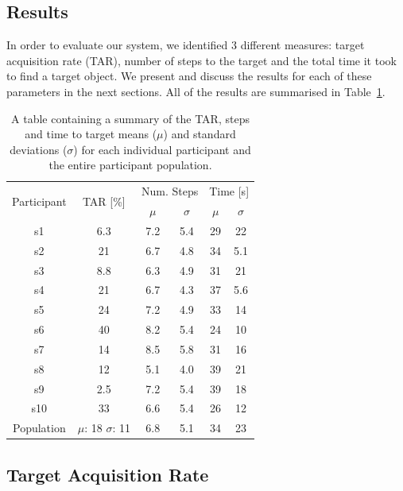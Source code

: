 \documentclass[a4paper, twoside]{article}
\begin{document}
\subsection{Results}

\noindent In order to evaluate our system, we identified 3 different measures: target acquisition rate (TAR), number of steps to the target and the total time it took to find a target object. We present and discuss the results for each of these parameters in the next sections. All of the results are summarised in Table~\ref{tab:results-summary}.

\begin{table}
  \centering
  \caption{A table containing a summary of the TAR, steps and time to target means ($\mu$) and standard deviations ($\sigma$) for each individual participant and the entire participant population.}\label{tab:results-summary}
  \begin{tabular}{cc|cc|cc}
    \toprule
    \multirow{2}{*}{Participant} & \multirow{2}{*}{TAR [\%]} & \multicolumn{2}{c|}{Num. Steps} & \multicolumn{2}{c}{Time [s]} \\ 
				 &			     & $\mu$ & $\sigma$		       & $\mu$ & $\sigma$  \\ \midrule
    s1 & 6.3 & 7.2 & 5.4 & 29 & 22 \\ \midrule
    s2 & 21 & 6.7 & 4.8 & 34 & 5.1 \\ \midrule
    s3 & 8.8 & 6.3 & 4.9 & 31 & 21 \\ \midrule
    s4 & 21 & 6.7 & 4.3 & 37 & 5.6 \\ \midrule
    s5 & 24 & 7.2 & 4.9 & 33 & 14 \\ \midrule
    s6 & 40 & 8.2 & 5.4 & 24 & 10 \\ \midrule
    s7 & 14 & 8.5 & 5.8 & 31 & 16 \\ \midrule
    s8 & 12 & 5.1 & 4.0 & 39 & 21 \\ \midrule
    s9 & 2.5 & 7.2 & 5.4 & 39 & 18 \\ \midrule
    s10 & 33 & 6.6 & 5.4 & 26 & 12 \\ \midrule\midrule
    Population & $\mu$: 18 $\sigma$: 11 & 6.8 & 5.1 & 34 & 23 \\
    \bottomrule
  \end{tabular}
\end{table}

\subsection{Target Acquisition Rate}
\end{document}
